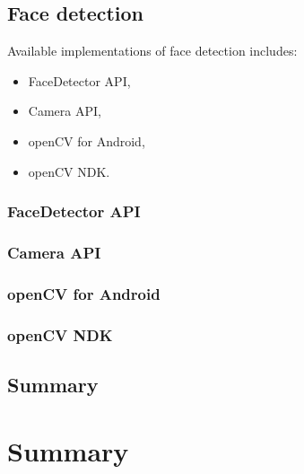 \documentclass[openany]{mgr} %
\begin{document}
\section{Face detection}
Available implementations of face detection includes:
\begin{itemize}
  \item FaceDetector API,
  \item Camera API,
  \item openCV for Android,
  \item openCV NDK.
\end{itemize}


\subsection{FaceDetector API}

\subsection{Camera API}

\subsection{openCV for Android}

\subsection{openCV NDK}

\section{Summary}

\chapter{Summary}
\end{document}
